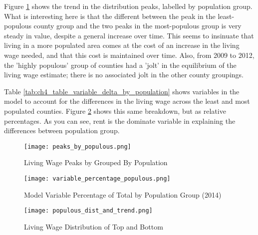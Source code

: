 Figure \ref{f:ch4_peaks_by_populous} shows the trend in the distribution peaks, labelled by population group. What is interesting here is that the different between the peak in the least-populous county group and the two peaks in the most-populous group is very steady in value, despite a general increase over time. This seems to insinuate that living in a more populated area comes at the cost of an increase in the living wage needed, and that this cost is maintained over time. Also, from 2009 to 2012, the 'highly populous' group of counties had a 'jolt' in the equilibrium of the living wage estimate; there is no associated jolt in the other county groupings.

Table \ref{tab:ch4_table_variable_delta_by_population} shows variables in the model to account for the differences in the living wage across the least and most populated counties. Figure \ref{f:ch4_variable_percentage_populous} shows this same breakdown, but as relative percentages. As you can see, rent is the dominate variable in explaining the differences between population group.



\begin{figure}[H]
    \centering
        \texttt{[image: peaks\_by\_populous.png]}
        \caption{Living Wage Peaks by Grouped By Population}
    \label{f:ch4_peaks_by_populous}
\end{figure}

\begin{figure}[H]
    \centering
        \texttt{[image: variable\_percentage\_populous.png]}
        \caption{Model Variable Percentage of Total by Population Group (2014)}
    \label{f:ch4_variable_percentage_populous}
\end{figure}

\begin{figure}[H]
    \centering
        \texttt{[image: populous\_dist\_and\_trend.png]}
        \caption{Living Wage Distribution of Top and Bottom }
    \label{f:ch4_populous_dist_and_trend}
\end{figure}

